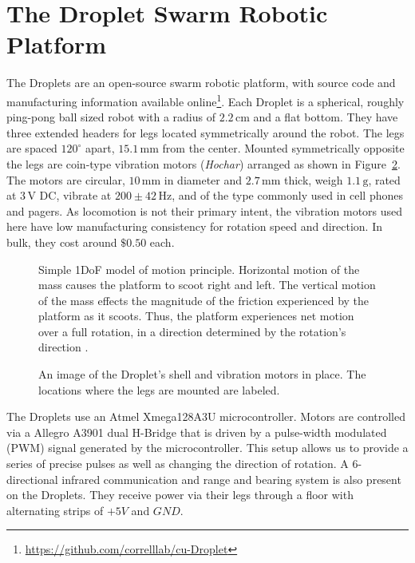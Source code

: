 \documentclass[letterpaper, 10pt, conference]{ieeeconf}
\begin{document}
\section{The Droplet Swarm Robotic Platform}
The Droplets are an open-source swarm robotic platform, with source code and manufacturing information available online\footnote{\url{https://github.com/correlllab/cu-Droplet}}. Each Droplet is a spherical, roughly ping-pong ball sized robot with a radius of $2.2\,\mathrm{cm}$ and a flat bottom. They have three extended headers for legs located symmetrically around the robot. The legs are spaced $120^\circ$ apart, $15.1\, \mathrm{mm}$ from the center. Mounted symmetrically opposite the legs are coin-type vibration motors (\emph{Hochar}) arranged as shown in Figure~\ref{fig:PWMs}. The  motors  are circular, $10\,\mathrm{mm}$ in diameter and $2.7\,\mathrm{mm}$ thick, weigh $1.1\,\mathrm{g}$, rated at $3\,\mathrm{V}$ DC, vibrate at $200\pm42\,\mathrm{Hz}$, and of the type commonly used in cell phones and pagers. As locomotion is not their primary intent, the vibration motors used here have low manufacturing consistency for rotation speed and direction. In bulk, they cost around $\$0.50$ each.
\begin{figure}[hb]
\setcounter{figure}{2}
\centering

\caption{Simple 1DoF model of motion principle. Horizontal motion of the mass causes the platform to scoot right and left. The vertical motion of the mass effects the magnitude of the friction experienced by the platform as it scoots. Thus, the platform experiences net motion over a full rotation, in a direction determined by the rotation's direction \cite{Vartholomeos2005}.}
\label{motorDiagram}
\end{figure}
\begin{figure}[h]
\setcounter{figure}{1}
	\centering
	
	\caption{An image of the Droplet's shell and vibration motors in place. The locations where the legs are mounted are labeled.}
	\label{fig:PWMs}
\setcounter{figure}{3}
\end{figure}

The Droplets use an Atmel Xmega128A3U microcontroller. Motors are controlled via a Allegro A3901 dual H-Bridge that is driven by a pulse-width modulated (PWM) signal generated by the microcontroller. This setup allows us to provide a series of precise pulses as well as changing the direction of rotation. A 6-directional infrared communication and range and bearing system \cite{farrow14} is also present on the Droplets. They receive power via their legs through a floor with alternating strips of $+5V$ and $GND$.
\end{document}
